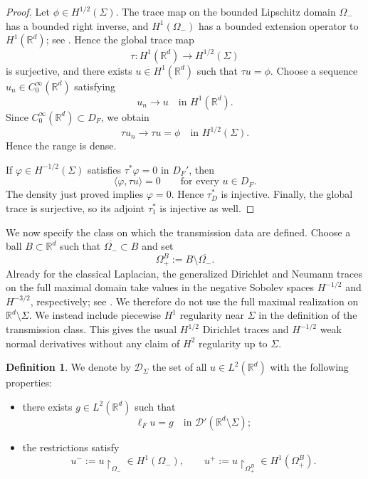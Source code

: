 \documentclass[a4paper,11pt]{article}
\numberwithin{equation}{section}
\theoremstyle{remark}
\theoremstyle{definition}
\newtheorem{defn}[lem]{Definition}
\theoremstyle{remark}
\begin{document}
\begin{proof}
Let $\phi\in H^{1/2}(\Sigma)$.
The trace map on the bounded Lipschitz domain $\Omega_-$ has a bounded right inverse, and $H^1(\Omega_-)$ has a bounded extension operator to $H^1(\mathbb R^d)$; see \cite{AdamsFournier2003,McLean2000}.
Hence the global trace map
$$
\tau:H^1(\mathbb R^d)\to H^{1/2}(\Sigma)
$$
is surjective, and there exists $u\in H^1(\mathbb R^d)$ such that $\tau u=\phi$.
Choose a sequence $u_n\in C_0^\infty(\mathbb R^d)$ satisfying
$$
u_n\to u\quad\text{in }H^1(\mathbb R^d).
$$
Since $C_0^\infty(\mathbb R^d)\subset D_F$, we obtain
$$
\tau u_n\to\tau u=\phi
\quad\text{in }H^{1/2}(\Sigma).
$$
Hence the range is dense.

If $\varphi\in H^{-1/2}(\Sigma)$ satisfies $\tau^*\varphi=0$ in $D_F'$, then
$$
\langle\varphi,\tau u\rangle=0
\qquad\text{for every }u\in D_F.
$$
The density just proved implies $\varphi=0$.
Hence $\tau_D^*$ is injective.
Finally, the global trace is surjective, so its adjoint $\tau_1^*$ is injective as well.
\end{proof}

We now specify the class on which the transmission data are defined.
Choose a ball $B\subset\mathbb R^d$ such that $\overline{\Omega_-}\subset B$ and set
$$
\Omega_+^B:=B\setminus\overline{\Omega_-}.
$$
Already for the classical Laplacian, the generalized Dirichlet and Neumann
traces on the full maximal domain take values in the negative Sobolev spaces
$H^{-1/2}$ and $H^{-3/2}$, respectively; see
\cite[Theorems~8.3.9 and 8.3.10]{BehrndtHassiSnoo2020}.
We therefore do not use the full maximal realization on $\mathbb R^d\setminus\Sigma$.
We instead include piecewise $H^1$ regularity near $\Sigma$ in the definition of the transmission class.
This gives the usual $H^{1/2}$ Dirichlet traces and $H^{-1/2}$ weak normal derivatives without any claim of $H^2$ regularity up to $\Sigma$.

\begin{defn}
We denote by $\mathcal D_\Sigma$ the set of all $u\in L^2(\mathbb R^d)$ with the following properties:
\begin{itemize}
\item[(a)] there exists $g\in L^2(\mathbb R^d)$ such that
$$
\ell_Fu=g
\quad\text{in }\mathcal D'(\mathbb R^d\setminus\Sigma);
$$
\item[(b)] the restrictions satisfy
$$
u^-:=u\upharpoonright_{\Omega_-}\in H^1(\Omega_-),
\qquad
u^+:=u\upharpoonright_{\Omega_+^B}\in H^1(\Omega_+^B).
$$
\end{itemize}
\end{defn}
\end{document}

